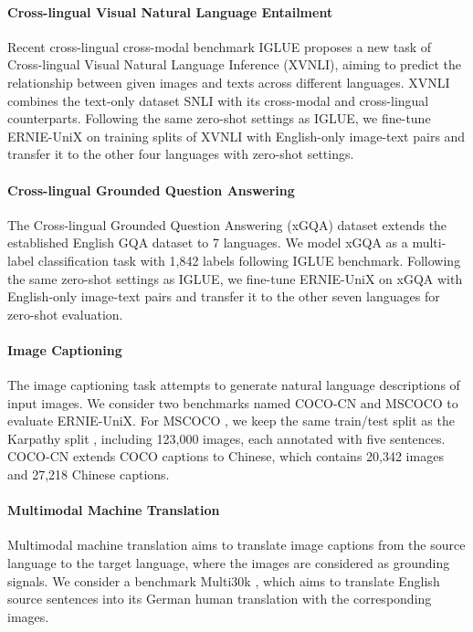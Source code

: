 \documentclass{article}
\begin{document}
\paragraph{Cross-lingual Visual Natural Language Entailment}
Recent cross-lingual cross-modal benchmark IGLUE \cite{iglue2022} proposes a new task of Cross-lingual Visual Natural Language Inference (XVNLI), aiming to predict the relationship between given images and texts across different languages. XVNLI combines the text-only dataset SNLI \cite{snli2015} with its cross-modal \cite{xvnli-modal} and cross-lingual \cite{xvnli-lingual} counterparts. Following the same zero-shot settings as IGLUE, we fine-tune ERNIE-UniX on training splits of XVNLI with English-only image-text pairs and transfer it to the other four languages with zero-shot settings.
\paragraph{Cross-lingual Grounded Question Answering }
The Cross-lingual Grounded Question Answering (xGQA) \cite{xGQA2021} dataset extends the established English GQA \cite{GQA2019} dataset to 7 languages. We model xGQA as a multi-label classification task with 1,842 labels following IGLUE \cite{iglue2022} benchmark. Following the same zero-shot settings as IGLUE, we fine-tune ERNIE-UniX on xGQA with English-only image-text pairs and transfer it to the other seven languages for zero-shot evaluation. 
\paragraph{Image Captioning}
The image captioning task attempts to generate natural language descriptions of input images. We consider two benchmarks named COCO-CN \cite{cococn} and MSCOCO \cite{mscoco} to evaluate ERNIE-UniX. For MSCOCO \cite{mscoco}, we keep the same train/test split as the Karpathy split \cite{Karpathy-split}, including 123,000 images, each annotated with five sentences. COCO-CN \cite{cococn} extends COCO captions to Chinese, which contains 20,342 images and 27,218 Chinese captions.
\paragraph{Multimodal Machine Translation}
Multimodal machine translation aims to translate image captions from the source language to the target language, where the images are considered as grounding signals. We consider a benchmark Multi30k \cite{elliott-etal-2016-multi30k}, which aims to translate English source sentences into its German human translation with the corresponding images.
\end{document}
